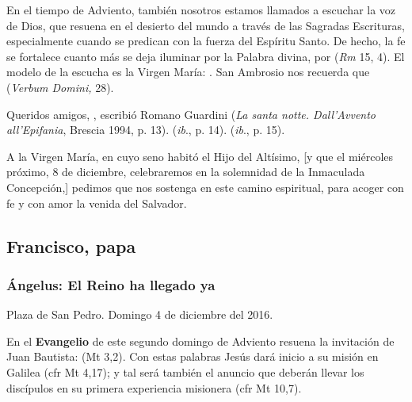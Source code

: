 \begin{body}
\begin{body}
En el tiempo de Adviento, también nosotros estamos llamados a escuchar la voz de Dios, que resuena en el desierto del mundo a través de las Sagradas Escrituras, especialmente cuando se predican con la fuerza del Espíritu Santo. De hecho, la fe se fortalece cuanto más se deja iluminar por la Palabra divina, por  (\emph{Rm} 15, 4). El modelo de la escucha es la Virgen María: . San Ambrosio nos recuerda que  (\emph{Verbum Domini,} 28).

Queridos amigos, , escribió Romano Guardini (\emph{La santa notte. Dall'Avvento all'Epifania}, Brescia 1994, p. 13).  (\emph{ib}., p. 14).  (\emph{ib}., p. 15).

A la Virgen María, en cuyo seno habitó el Hijo del Altísimo, {[}y que el miércoles próximo, 8 de diciembre, celebraremos en la solemnidad de la Inmaculada Concepción,{]} pedimos que nos sostenga en este camino espiritual, para acoger con fe y con amor la venida del Salvador.


\subsection{Francisco, papa}

\subsubsection{Ángelus: El Reino ha llegado ya}

Plaza de San Pedro. Domingo 4 de diciembre del 2016.

En el \textbf{Evangelio} de este segundo domingo de Adviento resuena la invitación de Juan Bautista:  (Mt 3,2). Con estas palabras Jesús dará inicio a su misión en Galilea (cfr Mt 4,17); y tal será también el anuncio que deberán llevar los discípulos en su primera experiencia misionera (cfr Mt 10,7).


\end{body}
\end{body}

